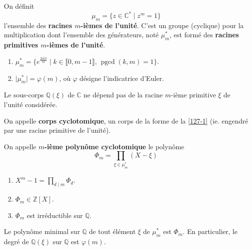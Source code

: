   \begin{definition}
    On définit
    \[ \mu_m = \{ z \in \mathbb{C}^* \mid z^m = 1 \} \]
    l'ensemble des \textbf{racines $m$-ièmes de l'unité}. C'est un groupe (cyclique) pour la multiplication dont l'ensemble des générateurs, noté $\mu_m^*$, est formé des \textbf{racines primitives $m$-ièmes de l'unité}.
  \end{definition}

  \begin{proposition}
    \begin{enumerate}[label={\bfseries(\roman*)}]
      \item $\mu_m^* = \{ e^{\frac{2ik\pi}{m}} \mid k \in \llbracket 0, m-1 \rrbracket, \, \operatorname{pgcd}(k, m) = 1 \}$.
      \item $\vert \mu_m^* \vert = \varphi(m)$, où $\varphi$ désigne l'indicatrice d'Euler.
    \end{enumerate}
  \end{proposition}

  \begin{proposition}
    \label{127-1}
    Le sous-corps $\mathbb{Q}(\xi)$ de $\mathbb{C}$ ne dépend pas de la racine $m$-ième primitive $\xi$ de l'unité considérée.
  \end{proposition}

  \begin{definition}
    On appelle \textbf{corps cyclotomique}, un corps de la forme de la \cref{127-1} (ie. engendré par une racine primitive de l'unité).
  \end{definition}

  \begin{definition}
    On appelle \textbf{$m$-ième polynôme cyclotomique} le polynôme
    \[ \Phi_m = \prod_{\xi \in \mu_m^*} (X - \xi) \]
  \end{definition}

  \begin{theorem}
    \begin{enumerate}[label={\bfseries(\roman*)}]
      \item $X^m - 1 = \prod_{d \mid m} \Phi_d$.
      \item $\Phi_m \in \mathbb{Z}[X]$.
      \item $\Phi_m$ est irréductible sur $\mathbb{Q}$.
    \end{enumerate}
  \end{theorem}

  \begin{corollary}
    Le polynôme minimal sur $\mathbb{Q}$ de tout élément $\xi$ de $\mu_m^*$ est $\Phi_m$. En particulier, le degré de $\mathbb{Q}(\xi)$ sur $\mathbb{Q}$ est $\varphi(m)$.
  \end{corollary}

